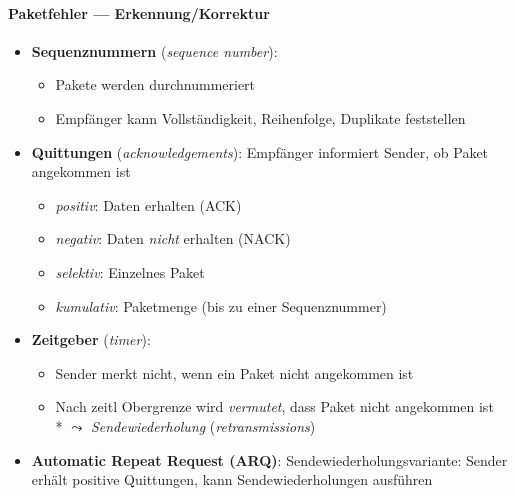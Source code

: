 \paragraph{Paketfehler --- Erkennung/Korrektur}
\begin{itemize}
  \item \textbf{Sequenznummern} (\emph{sequence number}):
  \begin{itemize}
    \item Pakete werden durchnummeriert
    \item Empfänger kann Vollständigkeit, Reihenfolge, Duplikate feststellen
  \end{itemize}
  \item \textbf{Quittungen} (\emph{acknowledgements}): Empfänger informiert Sender, ob Paket angekommen ist
  \begin{itemize}
    \item \emph{positiv}: Daten erhalten (ACK)
    \item \emph{negativ}: Daten \emph{nicht} erhalten (NACK)
    \item \emph{selektiv}: Einzelnes Paket
    \item \emph{kumulativ}: Paketmenge (bis zu einer Sequenznummer)
  \end{itemize}
  \item \textbf{Zeitgeber} (\emph{timer}):
  \begin{itemize}
    \item Sender merkt nicht, wenn ein Paket nicht angekommen ist
    \item Nach zeitl Obergrenze wird \emph{vermutet}, dass Paket nicht angekommen ist \\* \( \leadsto \) \emph{Sendewiederholung} (\emph{retransmissions})
  \end{itemize}
  \item \textbf{Automatic Repeat Request (ARQ)}: Sendewiederholungsvariante: Sender erhält positive Quittungen, kann Sendewiederholungen ausführen
\end{itemize}

